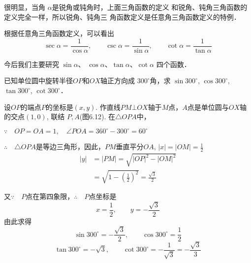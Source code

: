 很明显，当角 $\alpha$是锐角或钝角时，上面三角函数的定义
和锐角、钝角三角函数的定义完全一样，所以锐角、钝角三
角函数定义是任意角三角函数定义的特例．

根据任意角三角函数定义，可以看出
\[\sec\alpha=\frac{1}{\cos\alpha},\qquad \csc \alpha=\frac{1}{\sin\alpha},\qquad \cot \alpha=\frac{1}{\tan\alpha}\]

今后我们主要研究
$\sin \alpha$、 $\cos \alpha$、$\tan \alpha$、$\cot \alpha$ 四个函数．

\begin{example}
    已知单位圆中旋转半径$OP$和$OX$轴正方向成
$300^{\circ}$角，求 $\sin300^{\circ}$, $\cos300^{\circ}$, $\tan 300^{\circ}$, $\cot300^{\circ}$．

\end{example}

\begin{solution}
    设$OP$的端点$P$的坐标是$(x,y)$. 作直线$PM\bot OX$轴于$M$点，$A$点是单位圆与$OX$轴的交点$(1,0)$, 联结
$P,A$(图6.12). 在$\triangle OPA$中，

$\because\quad OP=OA=1,\quad \angle POA=360^{\circ}-300^{\circ}=60^{\circ}$

$\therefore\quad \triangle OPA$是等边三角形，因此，$PM$垂直平分$OA$,
$|x|=|OM|=\frac{1}{2}$
\[\begin{split}
    |y|&=|PM|=\sqrt{|OP|^2-|OM|^2}\\
&=\sqrt{1-\left(\frac{1}{2}\right)^2}=\frac{\sqrt{3}}{2}
\end{split}\]

\begin{figure}[htp]
    \centering
{}
    \caption{}
\end{figure}

又$\because\quad P$点在第四象限，$\therefore\quad P$点坐标是
\[x=\frac{1}{2},\qquad y=-\frac{\sqrt{3}}{2}\]
由此求得
\[\sin300^{\circ}=-\frac{\sqrt{3}}{2},\qquad 
\cos300^{\circ}=\frac{1}{2}\]
\[
\tan300^{\circ}=-\sqrt{3},\qquad 
\cot300^{\circ}=-\frac{1}{\sqrt{3}}=-\frac{\sqrt{3}}{3}\]
\end{solution}


